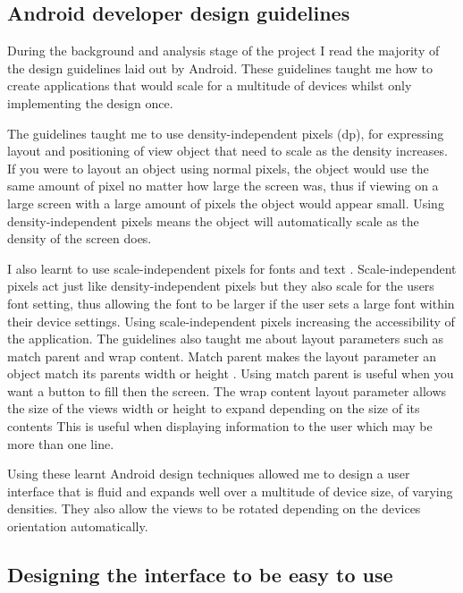 \subsection{Android developer design guidelines}

During the background and analysis stage of the project I read the majority of the design guidelines \cite{android_design} laid out by Android. These guidelines taught me how to create applications that would scale for a multitude of devices whilst only implementing the design once. 

The guidelines \cite{android_design} taught me to use density-independent pixels (dp), for expressing layout and positioning of view object that need to scale as the density increases. If you were to layout an object using normal pixels, the object would use the same amount of pixel no matter how large the screen was, thus if viewing on a large screen with a large amount of pixels the object would appear small. Using density-independent pixels means the object will automatically scale as the density of the screen does.

I also learnt to use scale-independent pixels for fonts and text \cite{android_design}. Scale-independent pixels act just like density-independent pixels but they also scale for the users font setting, thus allowing the font to be larger if the user sets a large font within their device settings. Using scale-independent pixels increasing the accessibility of the application.
The guidelines also taught me about layout parameters such as match parent and wrap content. Match parent makes the layout parameter an object match its parents width or height \cite{android_design}. Using match parent is useful when you want a button to fill then the screen. The wrap content layout parameter allows the size of the views width or height to expand depending on the size of its contents This is useful when displaying information to the user which may be more than one line. 

Using these learnt Android design techniques allowed me to design a user interface that is fluid and expands well over a multitude of device size, of varying densities. They also allow the views to be rotated depending on the devices orientation automatically.

\subsection{Designing the interface to be easy to use}

